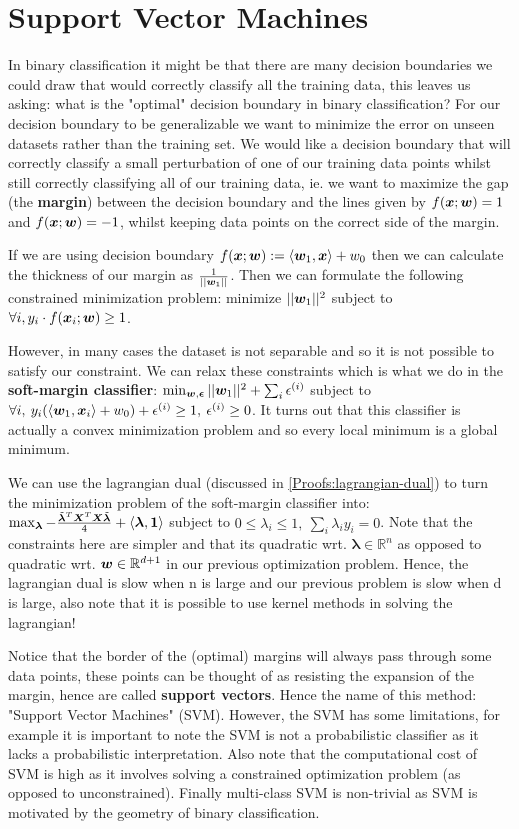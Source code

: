 \section{Support Vector Machines}\label{section:Support-Vector-Machines}
In binary classification it might be that there are many decision boundaries we could draw that would correctly classify all the training data, this leaves us asking: what is the "optimal" decision boundary in binary classification? For our decision boundary to be generalizable we want to minimize the error on unseen datasets rather than the training set. We would like a decision boundary that will correctly classify a small perturbation of one of our training data points whilst still correctly classifying all of our training data, ie. we want to maximize the gap (the \textbf{margin}) between the decision boundary and the lines given by $f(\bm{x};\bm{w}) = 1$ and $f(\bm{x};\bm{w}) = -1$, whilst keeping data points on the correct side of the margin. 

If we are using decision boundary $f(\bm{x};\bm{w}) := \langle\bm{w}_{1},\bm{x}\rangle + w_{0}$ then we can calculate the thickness of our margin as $\frac{1}{||\bm{w}_{1}||}$. Then we can formulate the following constrained minimization problem: minimize $||\bm{w}_{1}||^{2}$ subject to $\forall i, y_{i} \cdot f(\bm{x}_{i};\bm{w}) \geq 1$.

However, in many cases the dataset is not separable and so it is not possible to satisfy our constraint. We can relax these constraints which is what we do in the \textbf{soft-margin classifier}: $\min_{\bm{w}, \bm{\epsilon}} ||\bm{w}_{1}||^{2} + \sum_{i} \epsilon^{(i)}$ subject to $\forall i , \: y_{i}(\langle\bm{w}_{1},\bm{x}_{i} \rangle + w_{0}) + \epsilon^{(i)} \geq 1, \: \epsilon^{(i)} \geq 0$. It turns out that this classifier is actually a convex minimization problem and so every local minimum is a global minimum.

We can use the lagrangian dual (discussed in \cref{Proofs:lagrangian-dual}) to turn the minimization problem of the soft-margin classifier into: $\max_{\bm{\lambda}} - \frac{\tilde{\bm{\lambda}}^{T} \bm{X}^{T} \bm{X} \tilde{\bm{\lambda}}}{4} + \langle\bm{\lambda},\bm{1} \rangle$ subject to $0 \leq \lambda_{i} \leq 1, \: \sum_{i} \lambda_{i} y_{i} =0$. Note that the constraints here are simpler and that its quadratic wrt. $\bm{\lambda} \in \mathbb{R}^{n}$ as opposed to quadratic wrt. $\bm{w} \in \mathbb{R}^{d+1}$ in our previous optimization problem. Hence, the lagrangian dual is slow when n is large and our previous problem is slow when d is large, also note that it is possible to use kernel methods in solving the lagrangian!

Notice that the border of the (optimal) margins will always pass through some data points, these points can be thought of as resisting the expansion of the margin, hence are called \textbf{support vectors}. Hence the name of this method: "Support Vector Machines" (SVM). However, the SVM has some limitations, for example it is important to note the SVM is not a probabilistic classifier as it lacks a probabilistic interpretation. Also note that the computational cost of SVM is high as it involves solving a constrained optimization problem (as opposed to unconstrained). Finally multi-class SVM is non-trivial as SVM is motivated by the geometry of binary classification. 